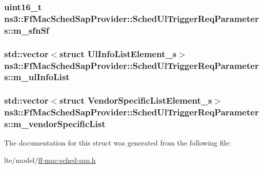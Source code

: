 \subsubsection[{\texorpdfstring{m\+\_\+sfn\+Sf}{m_sfnSf}}]{\setlength{\rightskip}{0pt plus 5cm}uint16\+\_\+t ns3\+::\+Ff\+Mac\+Sched\+Sap\+Provider\+::\+Sched\+Ul\+Trigger\+Req\+Parameters\+::m\+\_\+sfn\+Sf}\hypertarget{structns3_1_1FfMacSchedSapProvider_1_1SchedUlTriggerReqParameters_a119a46d1e31202dd95df83c0c8eb35ac}{}\label{structns3_1_1FfMacSchedSapProvider_1_1SchedUlTriggerReqParameters_a119a46d1e31202dd95df83c0c8eb35ac}
\subsubsection[{\texorpdfstring{m\+\_\+ul\+Info\+List}{m_ulInfoList}}]{\setlength{\rightskip}{0pt plus 5cm}std\+::vector$<$struct {\bf Ul\+Info\+List\+Element\+\_\+s}$>$ ns3\+::\+Ff\+Mac\+Sched\+Sap\+Provider\+::\+Sched\+Ul\+Trigger\+Req\+Parameters\+::m\+\_\+ul\+Info\+List}\hypertarget{structns3_1_1FfMacSchedSapProvider_1_1SchedUlTriggerReqParameters_a13dd97c0be9caa43a95c8e86752f1f2d}{}\label{structns3_1_1FfMacSchedSapProvider_1_1SchedUlTriggerReqParameters_a13dd97c0be9caa43a95c8e86752f1f2d}
\subsubsection[{\texorpdfstring{m\+\_\+vendor\+Specific\+List}{m_vendorSpecificList}}]{\setlength{\rightskip}{0pt plus 5cm}std\+::vector$<$struct {\bf Vendor\+Specific\+List\+Element\+\_\+s}$>$ ns3\+::\+Ff\+Mac\+Sched\+Sap\+Provider\+::\+Sched\+Ul\+Trigger\+Req\+Parameters\+::m\+\_\+vendor\+Specific\+List}\hypertarget{structns3_1_1FfMacSchedSapProvider_1_1SchedUlTriggerReqParameters_a787df6defa094ff4e2e9c3b28ddd42f0}{}\label{structns3_1_1FfMacSchedSapProvider_1_1SchedUlTriggerReqParameters_a787df6defa094ff4e2e9c3b28ddd42f0}


The documentation for this struct was generated from the following file\+:\begin{DoxyCompactItemize}
\item 
lte/model/\hyperlink{ff-mac-sched-sap_8h}{ff-\/mac-\/sched-\/sap.\+h}\end{DoxyCompactItemize}
